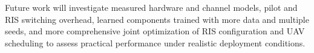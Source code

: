 \documentclass[journal]{IEEEtran}
\begin{document}
Future work will investigate measured hardware and channel models, pilot and RIS switching overhead, learned components trained with more data and multiple seeds, and more comprehensive joint optimization of RIS configuration and UAV scheduling to assess practical performance under realistic deployment conditions.



\end{document}
